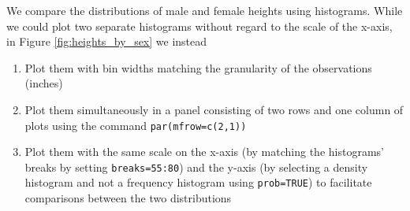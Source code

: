 \documentclass{article}\usepackage[]{graphicx}\usepackage[]{color}
\begin{document}
We compare the distributions of male and female heights using histograms.  While we could plot two separate histograms without regard to the scale of the x-axis, in Figure \ref{fig:heights_by_sex} we instead

\begin{enumerate}
\item Plot them with bin widths matching the granularity of the observations (inches)
\item Plot them simultaneously in a panel consisting of two rows and one column of plots using the command \verb#par(mfrow=c(2,1))#
\item Plot them with the same scale on the x-axis (by matching the histograms' breaks by setting \verb#breaks=55:80#) and the y-axis (by selecting a density histogram and not a frequency histogram using \verb#prob=TRUE#) to facilitate comparisons between the two distributions
\end{enumerate}
\end{document}

